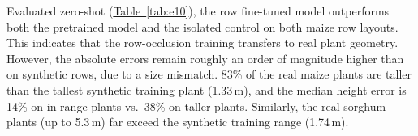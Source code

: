 \documentclass[10pt,twocolumn,letterpaper]{article}
\newcommand{\tabref}[1]{\hyperref[#1]{Table~\ref*{#1}}}
\begin{document}
Evaluated zero-shot (\tabref{tab:e10}), the row fine-tuned model outperforms both the pretrained model and the isolated control on both maize row layouts. This indicates that the row-occlusion training transfers to real plant geometry. However, the absolute errors remain roughly an order of magnitude higher than on synthetic rows, due to a size mismatch. 83\% of the real maize plants are taller than the tallest synthetic training plant (1.33\,m), and the median height error is 14\% on in-range plants vs.\ 38\% on taller plants. Similarly, the real sorghum plants (up to 5.3\,m) far exceed the synthetic training range (1.74\,m).


\begin{table}[t]
  \caption{\textbf{Rows assembled from real plants.} All three sensor streams are given as input. Target Chamfer distance ($10^{-4}$\,m$^2$, 95\% plant bootstrap CI), Miss@5\,mm (ground-truth points $>5$\,mm from prediction), median relative height error, and $\pm 1$-leaf accuracy across camera stops. \emph{Real-row FT} denotes the row fine-tuned model trained on 75\% of the real plants. On synthetic test rows, the row fine-tuned model reaches 4.0 (maize) and 30.7 (sorghum).}


\end{table}
\end{document}
